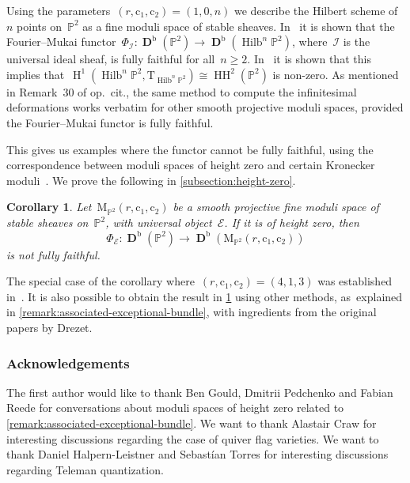 \documentclass[JEP,XML,SOM,Unicode,NoEqCountersInSection,published]{cedram}
\theoremstyle{plain}
\newtheorem{alphacorollary}[alphatheorem]{Corollary}
\theoremstyle{definition}
\DeclareMathOperator\derived{\mathbf{D}}
\DeclareMathOperator\HH{H}
\DeclareMathOperator\hochschild{HH}
\DeclareMathOperator\Hilb{Hilb}
\newcommand\bounded{\ensuremath{\mathrm{b}}}
\newcommand\moduli{\ensuremath{\mathrm{M}}}
\newcommand\tangent{\ensuremath{\mathrm{T}}}
\begin{document}
Using the parameters~$(r,\mathrm{c}_1,\mathrm{c}_2)=(1,0,n)$
we describe the Hilbert scheme of~$n$ points on~$\mathbb{P}^2$
as a fine moduli space of stable sheaves.
In~\cite[Th.\,1.2]{MR3397451} it is shown that the Fourier--Mukai functor~$\Phi_{\mathcal{I}}\colon\derived^\bounded(\mathbb{P}^2)\to\derived^\bounded(\Hilb^n\mathbb{P}^2)$,
where~$\mathcal{I}$ is the universal ideal sheaf,
is fully faithful for all~$n\geq 2$.
In~\cite[Prop.\,29]{MR3950704} it is shown that this implies that~$\HH^1(\Hilb^n\mathbb{P}^2,\tangent_{\Hilb^n\mathbb{P}^2})\cong\hochschild^2(\mathbb{P}^2)$ is non-zero.
As mentioned in Remark~30 of op.~cit.,
the same method to compute the infinitesimal deformations
works verbatim for other smooth projective moduli spaces,
provided the Fourier--Mukai functor is fully faithful.

This gives us examples where the functor cannot be fully faithful,
using the correspondence between moduli spaces of height zero
and certain Kronecker moduli~\cite[Th.\,2]{MR0916199}.
We prove the following in \cref{subsection:height-zero}.

\begin{alphacorollary}
\label{corollary:height-zero}
Let~$\moduli_{\mathbb{P}^2}(r,\mathrm{c}_1,\mathrm{c}_2)$ be a smooth projective
fine moduli space of stable sheaves on~$\mathbb{P}^2$,
with universal object~$\mathcal{E}$.
If it is of height zero,
then
\begin{equation}
\label{equation:height-zero-functor}
\Phi_{\mathcal{E}}\colon\derived^\bounded(\mathbb{P}^2)\to\derived^\bounded(\moduli_{\mathbb{P}^2}(r,\mathrm{c}_1,\mathrm{c}_2))
\end{equation}
is not fully faithful.
\end{alphacorollary}

The special case of the corollary where~$(r,\mathrm{c}_1,\mathrm{c}_2)=(4,1,3)$
was established in~\cite{MR4223526}.
It is also possible to obtain the result in \cref{corollary:height-zero} using other methods, as~explained in \cref{remark:associated-exceptional-bundle},
with ingredients from the original papers by Drezet.

\subsubsection*{Acknowledgements}

The first author would like to thank Ben Gould, Dmitrii Pedchenko and Fabian Reede
for conversations about moduli spaces of height zero
related to \cref{remark:associated-exceptional-bundle}.
We want to thank Alastair Craw for interesting discussions regarding the case of quiver flag varieties.
We want to thank Daniel Halpern-Leistner and Sebastían Torres for interesting discussions
regarding Teleman quantization.
\end{document}
